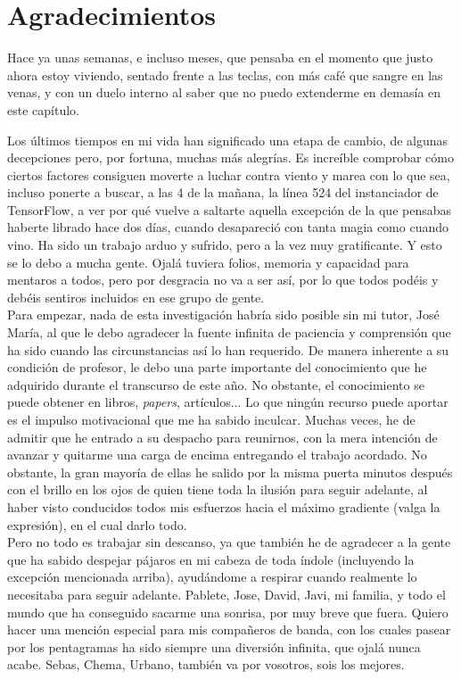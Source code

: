 \chapter*{Agradecimientos}

Hace ya unas semanas, e incluso meses, que pensaba en el momento que justo ahora estoy viviendo, sentado frente a las teclas, con más café que sangre en las venas, y con un duelo interno al saber que no puedo extenderme en demasía en este capítulo.

Los últimos tiempos en mi vida han significado una etapa de cambio, de algunas decepciones pero, por fortuna, muchas más alegrías. Es increíble comprobar cómo ciertos factores consiguen moverte a luchar contra viento y marea con lo que sea, incluso ponerte a buscar, a las 4 de la mañana, la línea 524 del instanciador de TensorFlow, a ver por qué vuelve a saltarte aquella excepción de la que pensabas haberte librado hace dos días, cuando desapareció con tanta magia como cuando vino. Ha sido un trabajo arduo y sufrido, pero a la vez muy gratificante. Y esto se lo debo a mucha gente. Ojalá tuviera folios, memoria y capacidad para mentaros a todos, pero por desgracia no va a ser así, por lo que todos podéis y debéis sentiros incluidos en ese grupo de gente.\\


Para empezar, nada de esta investigación habría sido posible sin mi tutor, José María, al que le debo agradecer la fuente infinita de paciencia y comprensión que ha sido cuando las circunstancias así lo han requerido. De manera inherente a su condición de profesor, le debo una parte importante del conocimiento que he adquirido durante el transcurso de este año. No obstante, el conocimiento se puede obtener en libros, \emph{papers}, artículos... Lo que ningún recurso puede aportar es el impulso motivacional que me ha sabido inculcar. Muchas veces, he de admitir que he entrado a su despacho para reunirnos, con la mera intención de avanzar y quitarme una carga de encima entregando el trabajo acordado. No obstante, la gran mayoría de ellas he salido por la misma puerta minutos después con el brillo en los ojos de quien tiene toda la ilusión para seguir adelante, al haber visto conducidos todos mis esfuerzos hacia el máximo gradiente (valga la expresión), en el cual darlo todo.\\

Pero no todo es trabajar sin descanso, ya que también he de agradecer a la gente que ha sabido despejar pájaros en mi cabeza de toda índole (incluyendo la excepción mencionada arriba), ayudándome a respirar cuando realmente lo necesitaba para seguir adelante. Pablete, Jose, David, Javi, mi familia, y todo el mundo que ha conseguido sacarme una sonrisa, por muy breve que fuera. Quiero hacer una mención especial para mis compañeros de banda, con los cuales pasear por los pentagramas ha sido siempre una diversión infinita, que ojalá nunca acabe. Sebas, Chema, Urbano, también va por vosotros, sois los mejores.\\

